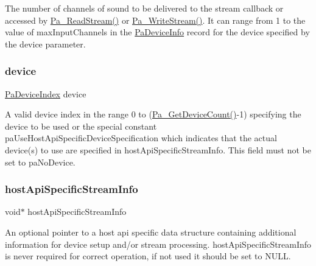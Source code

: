 The number of channels of sound to be delivered to the stream callback or accessed by \hyperlink{portaudio_8h_a0b62d4b74b5d3d88368e9e4c0b8b2dc7}{Pa\+\_\+\+Read\+Stream()} or \hyperlink{portaudio_8h_a075a6efb503a728213bdae24347ed27d}{Pa\+\_\+\+Write\+Stream()}. It can range from 1 to the value of max\+Input\+Channels in the \hyperlink{struct_pa_device_info}{Pa\+Device\+Info} record for the device specified by the device parameter. \mbox{\label{struct_pa_stream_parameters_a17f35b803980e0265685e1838a3ea60c}} 
\subsubsection{\texorpdfstring{device}{device}}
{\footnotesize\ttfamily \hyperlink{portaudio_8h_ad79317e65bde63d76c4b8e711ac5a361}{Pa\+Device\+Index} device}

A valid device index in the range 0 to (\hyperlink{portaudio_8h_acfe4d3c5ec1a343f459981bfa2057f8d}{Pa\+\_\+\+Get\+Device\+Count()}-\/1) specifying the device to be used or the special constant pa\+Use\+Host\+Api\+Specific\+Device\+Specification which indicates that the actual device(s) to use are specified in host\+Api\+Specific\+Stream\+Info. This field must not be set to pa\+No\+Device. \mbox{\label{struct_pa_stream_parameters_a04c386f76b545ad10b1ad925297175ff}} 
\subsubsection{\texorpdfstring{host\+Api\+Specific\+Stream\+Info}{hostApiSpecificStreamInfo}}
{\footnotesize\ttfamily void$\ast$ host\+Api\+Specific\+Stream\+Info}

An optional pointer to a host api specific data structure containing additional information for device setup and/or stream processing. host\+Api\+Specific\+Stream\+Info is never required for correct operation, if not used it should be set to N\+U\+LL. \mbox{\label{struct_pa_stream_parameters_ab1ffdd5f8a485c9733975ab81f7f5e5c}} 
